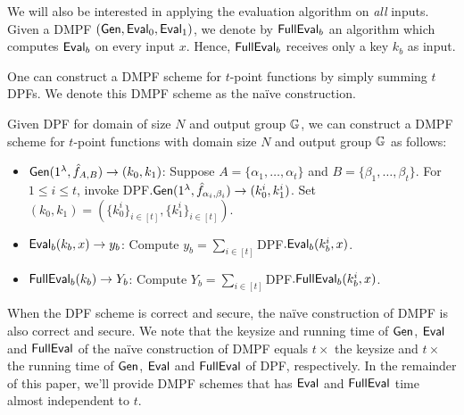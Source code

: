  We will also be interested in applying the evaluation algorithm on \emph{all} inputs. Given a DMPF $({\sf Gen},{\sf Eval}_0,{\sf Eval}_1)$, we denote by ${\sf FullEval}_b$ an algorithm which computes ${\sf Eval}_b$ on every input $x$. Hence, ${\sf FullEval}_b$ receives only a key $k_b$ as input.

 One can construct a DMPF scheme for $t$-point functions by simply summing $t$ DPFs. We denote this DMPF scheme as the na\"ive construction. 
\begin{construction}\label{con:naive_DMPF}
  Given DPF for domain of size $N$ and output group $\mathbb{G}$, we can construct a DMPF scheme for $t$-point functions with domain size $N$ and output group $\mathbb{G}$ as follows: 
  \begin{itemize}
    \item ${\sf Gen}(1^\lambda, \hat{f}_{A, B})\rightarrow (k_0, k_1)$: Suppose $A = \{\alpha_1,\dots, \alpha_t\}$ and $B = \{\beta_1,\dots, \beta_t\}$. For $1\le i\le t$, invoke DPF$.{\sf Gen}(1^\lambda, \hat{f}_{\alpha_i, \beta_i})\rightarrow (k_0^i, k_1^i)$. Set $(k_0, k_1) = (\{k_0^i\}_{i\in [t]}, \{k_1^i\}_{i\in [t]})$. 
    \item ${\sf Eval}_b(k_b, x)\rightarrow y_b$: Compute $y_b = \sum_{i\in [t]}$DPF$.{\sf Eval}_b(k_b^i, x)$. 
    \item ${\sf FullEval}_b(k_b)\rightarrow Y_b$: Compute $Y_b = \sum_{i\in [t]}$DPF$.{\sf FullEval}_b(k_b^i, x)$. 
  \end{itemize}
\end{construction}
When the DPF scheme is correct and secure, the na\"ive construction of DMPF is also correct and secure. We note that the keysize and running time of ${\sf Gen}$, ${\sf Eval}$ and ${\sf FullEval}$ of the na\"ive construction of DMPF equals $t\times $ the keysize and $t\times$ the running time of ${\sf Gen}$, ${\sf Eval}$ and ${\sf FullEval}$ of DPF, respectively. In the remainder of this paper, we'll provide DMPF schemes that has ${\sf Eval}$ and ${\sf FullEval}$ time almost independent to $t$. 
 
 

